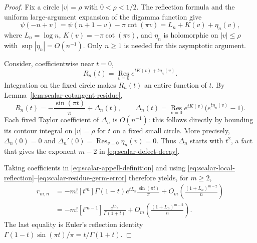 \documentclass[11pt,a4paper]{article}
\numberwithin{equation}{section}
\theoremstyle{definition}
\begin{document}
\begin{proof}
Fix a circle $|v|=\rho$ with $0<\rho<1/2$.  The reflection formula
and the uniform large-argument expansion of the digamma function give
\begin{equation}
 \psi(-n+v)=\psi(n+1-v)-\pi\cot(\pi v)
           =L_n+K(v)+\eta_n(v),
 \label{eq:scalar-local-reflection}
\end{equation}
where $L_n=\log n$, $K(v)=-\pi\cot(\pi v)$, and
$\eta_n$ is holomorphic on $|v|\leq\rho$ with
$\sup|\eta_n|=O(n^{-1})$.  Only $n\geq1$ is needed for this
asymptotic argument.

Consider, coefficientwise near $t=0$,
\begin{equation}
 R_n(t)=\operatorname*{Res}_{v=0}e^{tK(v)+t\eta_n(v)}.
 \label{eq:scalar-residue-germ}
\end{equation}
Integration on the fixed circle makes $R_n(t)$ an entire function
of $t$.  By Lemma~\ref{lem:scalar-cotangent-residue},
\begin{equation}
 R_n(t)=-\frac{\sin(\pi t)}{\pi}+\Delta_n(t),
 \qquad
 \Delta_n(t)=\operatorname*{Res}_{v=0}
       e^{tK(v)}\bigl(e^{t\eta_n(v)}-1\bigr).
 \label{eq:scalar-residue-germ-error}
\end{equation}
Each fixed Taylor coefficient of $\Delta_n$ is $O(n^{-1})$:
this follows directly by bounding its contour integral on
$|v|=\rho$ for $t$ on a fixed small circle.  More precisely,
$\Delta_n(0)=0$ and
$\Delta_n'(0)=\operatorname*{Res}_{v=0}\eta_n(v)=0$.
Thus $\Delta_n$ starts with $t^2$, a fact that gives the exponent
$m-2$ in \eqref{eq:scalar-defect-decay}.

Taking coefficients in
\eqref{eq:scalar-appell-definition} and using
\eqref{eq:scalar-local-reflection}--\eqref{eq:scalar-residue-germ-error}
therefore yields, for $m\geq2$,
\begin{equation}
 \begin{aligned}
 r_{m,n}
 &=-m![t^m]\Gamma(1-t)e^{tL_n}
                         \frac{\sin(\pi t)}{\pi}
       +O_m\!\left(\frac{(1+L_n)^{m-2}}{n}\right)\\
 &=-m![t^{m-1}]\frac{e^{tL_n}}{\Gamma(1+t)}
       +O_m\!\left(\frac{(1+L_n)^{m-2}}{n}\right).
 \end{aligned}
 \label{eq:scalar-nondecaying-polynomial}
\end{equation}
The last equality is Euler's reflection identity
$\Gamma(1-t)\sin(\pi t)/\pi=t/\Gamma(1+t)$.


\end{proof}
\end{document}
